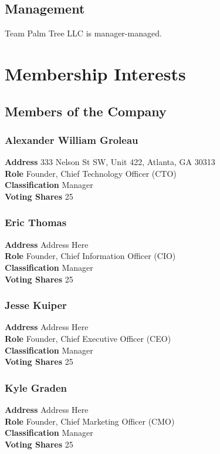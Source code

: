 \documentclass[11pt]{article}
\begin{document}
\subsection{Management}
Team Palm Tree LLC is manager-managed.

\section{Membership Interests}

\subsection{Members of the Company}

\subsubsection{Alexander William Groleau}
\textbf{Address} 333 Nelson St SW, Unit 422, Atlanta, GA 30313\\
\textbf{Role} Founder, Chief Technology Officer (CTO)\\
\textbf{Classification} Manager \\
\textbf{Voting Shares} 25

\subsubsection{Eric Thomas}
\textbf{Address} Address Here\\
\textbf{Role} Founder, Chief Information Officer (CIO)\\
\textbf{Classification} Manager \\
\textbf{Voting Shares} 25

\subsubsection{Jesse Kuiper}
\textbf{Address} Address Here\\
\textbf{Role} Founder, Chief Executive Officer (CEO)\\
\textbf{Classification} Manager \\
\textbf{Voting Shares} 25

\subsubsection{Kyle Graden}
\textbf{Address} Address Here\\
\textbf{Role} Founder, Chief Marketing Officer (CMO)\\
\textbf{Classification} Manager \\
\textbf{Voting Shares} 25
\end{document}
